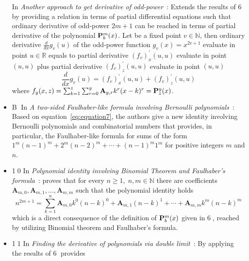 \begin{itemize}
    In \textit{Another approach to get derivative of odd-power}~\cite{another_approach_to_get_derivative_of_odd_power}:
    Extends the results of {\Large \textcircled{\normalsize 6}} by providing a relation in terms of partial differential equations such that
    ordinary derivative of odd-power $2m+1$ can be reached in terms of partial derivative of the polynomial ${\mathbf{P}}\sp{m} \sb{b}(x)$.
    Let be a fixed point $v\in \mathbb{N}$, then ordinary derivative $\frac{d}{dx} g_v (u)$ of the odd-power function $g_v(x) = x^{2v + 1}$
    evaluate in point $u\in\mathbb{R}$ equals to partial derivative $(f_{v})^{'}_{x} (u, u)$ evaluate in point $(u, u)$ plus
    partial derivative $(f_{v})^{'}_{z} (u, u)$ evaluate in point $(u, u)$
    \begin{equation}
        \frac{d}{dx} g_v (u) = (f_{v})^{'}_{x} (u, u) + (f_{v})^{'}_{z} (u, u)
        \label{eq:odd-exponential-identity}
    \end{equation}
    where $f_{y} (x, z) = \sum_{k=1}^{z} \sum_{r=0}^{y} {\mathbf{A}} \sb{y,r} k^r (x-k)^r = {\mathbf{P}}\sp{y} \sb{z}(x)$.
    \item {\Large \textcircled{\normalsize B}}
    In \textit{A two-sided Faulhaber-like formula involving Bernoulli polynomials}~\cite{barbero2020two}:
    Based on equation~\eqref{eq:equation7}, the authors give a new identity involving
    Bernoulli polynomials and combinatorial numbers that provides,
    in particular, the Faulhaber-like formula for sums of the form $1^m(n-1)^m + 2^m (n -2)^m + \cdots + (n - 1)^m 1^m$
    for positive integers $m$ and $n$.
    \item {\Large \textcircled{\normalsize 10}}
    In \textit{Polynomial identity involving Binomial Theorem and Faulhaber's formula}~\cite{polynomial_identity_with_binomial_theorem_and_faulhabers_formula}:
    proves that
    for every $n\geq 1, \; n,m\in\mathbb{N}$
    there are coefficients $\mathbf{A}_{m,0}, \mathbf{A}_{m,1}, \ldots, \mathbf{A}_{m,m}$ such that
    the polynomial identity holds
    \[
        n^{2m+1} = \sum_{k=1}^{n} \mathbf{A}_{m,0} k^0 (n-k)^0 + \mathbf{A}_{m,1}(n-k)^1
        + \cdots + \mathbf{A}_{m,m} k^m (n-k)^m
    \]
    which is a direct consequence of the definition of ${\mathbf{P}}\sp{m} \sb{b}(x)$ given in {\Large \textcircled{\normalsize 6}},
    reached by utilizing Binomial theorem and Faulhaber's formula.
    \item {\Large \textcircled{\normalsize 11}}
    In \textit{Finding the derivative of polynomials via double limit}~\cite{derivative_of_polynomials_via_double_limit}:
    By applying the results of {\Large \textcircled{\normalsize 6}} provides

\end{itemize}
